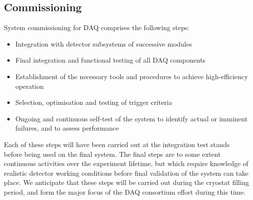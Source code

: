 \subsection{Commissioning}
\label{sec:fdsp-daq-commissioning}

System commissioning for DAQ comprises the following steps:

\begin{itemize}
	\item Integration with detector subsystems of successive modules
	\item Final integration and functional testing of all DAQ components
	\item Establishment of the necessary tools and procedures to achieve high-efficiency operation
	\item Selection, optimisation and testing of trigger criteria
	\item Ongoing and continuous self-test of the system to identify actual or imminent failures, and to assess performance
\end{itemize}

Each of these steps will have been carried out at the integration test stands before being used on the final system. The final steps are to some extent continuous activities over the experiment lifetime, but which require knowledge of realistic detector working conditions before final validation of the system can take place. We anticipate that these steps will be carried out during the cryostat filling period, and form the major focus of the DAQ consortium effort during this time.
